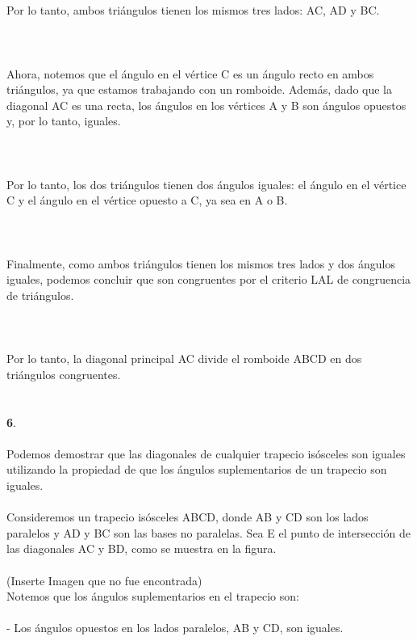 \documentclass{article}
\begin{document}
\\\\
Por lo tanto, ambos triángulos tienen los mismos tres lados: AC, AD y BC.\\\\
\\\\
Ahora, notemos que el ángulo en el vértice C es un ángulo recto en ambos triángulos, ya que estamos trabajando con un romboide. Además, dado que la diagonal AC es una recta, los ángulos en los vértices A y B son ángulos opuestos y, por lo tanto, iguales.\\\\
\\\\
Por lo tanto, los dos triángulos tienen dos ángulos iguales: el ángulo en el vértice C y el ángulo en el vértice opuesto a C, ya sea en A o B.\\\\
\\\\
Finalmente, como ambos triángulos tienen los mismos tres lados y dos ángulos iguales, podemos concluir que son congruentes por el criterio LAL de congruencia de triángulos.\\\\
\\\\
Por lo tanto, la diagonal principal AC divide el romboide ABCD en dos triángulos congruentes.\\\\
\\
{\textbf 6. }\\\\
Podemos demostrar que las diagonales de cualquier trapecio isósceles son iguales utilizando la propiedad de que los ángulos suplementarios de un trapecio son iguales.\\
\\
Consideremos un trapecio isósceles ABCD, donde AB y CD son los lados paralelos y AD y BC son las bases no paralelas. Sea E el punto de intersección de las diagonales AC y BD, como se muestra en la figura.\\
\\
(Inserte Imagen que no fue encontrada)\\
Notemos que los ángulos suplementarios en el trapecio son:\\
\\
-  Los ángulos opuestos en los lados paralelos, AB y CD, son iguales.\\
\end{document}
